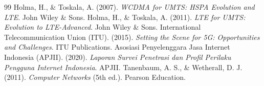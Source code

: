 \documentclass[12pt,a4paper]{article}
\begin{document}
\newpage


\begin{thebibliography}{99}
 Holma, H., \& Toskala, A. (2007). \textit{WCDMA for UMTS: HSPA Evolution and LTE}. John Wiley \& Sons.
 Holma, H., \& Toskala, A. (2011). \textit{LTE for UMTS: Evolution to LTE-Advanced}. John Wiley \& Sons.
 International Telecommunication Union (ITU). (2015). \textit{Setting the Scene for 5G: Opportunities and Challenges}. ITU Publications.
 Asosiasi Penyelenggara Jasa Internet Indonesia (APJII). (2020). \textit{Laporan Survei Penetrasi dan Profil Perilaku Pengguna Internet Indonesia}. APJII.
 Tanenbaum, A. S., \& Wetherall, D. J. (2011). \textit{Computer Networks} (5th ed.). Pearson Education.
\end{thebibliography}
\end{document}

